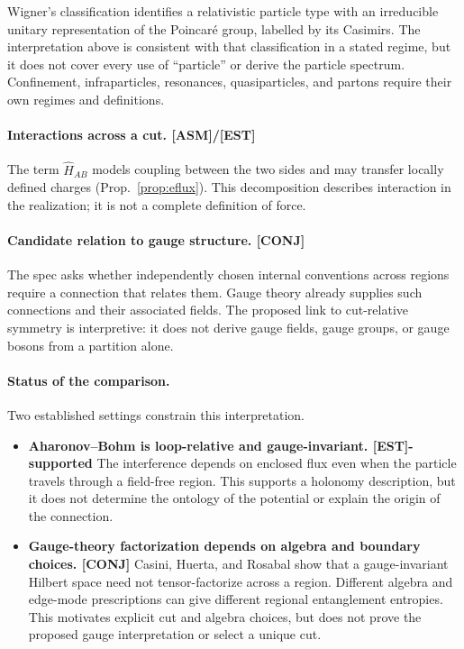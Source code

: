 \documentclass[11pt]{article}
\newcommand{\est}{\textcolor{teal!70!black}{\textsf{\small[EST]}}}
\newcommand{\fields}{\textcolor{violet}{\textsf{\small[FIELDS]}}}
\newcommand{\asm}{\textcolor{blue!70!black}{\textsf{\small[ASM]}}}
\newcommand{\conj}{\textcolor{orange!80!black}{\textsf{\small[CONJ]}}}
\newcommand{\post}{\textcolor{purple!70!black}{\textsf{\small[POST]}}}
\newcommand{\gap}{\textcolor{red!75!black}{\textsf{\small[GAP]}}}
\def\est{[EST]}\def\fields{[FIELDS]}\def\asm{[ASM]}%
\def\conj{[CONJ]}\def\post{[POST]}\def\gap{[GAP]}%
\theoremstyle{definition}
\theoremstyle{remark}
\begin{document}
\noindent Wigner's classification identifies a relativistic particle type with an irreducible unitary representation of the Poincar\'e group, labelled by its Casimirs. The interpretation above is consistent with that classification in a stated regime, but it does not cover every use of ``particle'' or derive the particle spectrum. Confinement, infraparticles, resonances, quasiparticles, and partons require their own regimes and definitions.

\paragraph{Interactions across a cut. \asm/\est}
The term $\hat{H}_{AB}$ models coupling between the two sides and may transfer locally defined charges (Prop.~\ref{prop:eflux}). This decomposition describes interaction in the realization; it is not a complete definition of force.

\paragraph{Candidate relation to gauge structure. \conj}
The spec asks whether independently chosen internal conventions across regions require a connection that relates them. Gauge theory already supplies such connections and their associated fields. The proposed link to cut-relative symmetry is interpretive: it does not derive gauge fields, gauge groups, or gauge bosons from a partition alone.

\paragraph{Status of the comparison.}
Two established settings constrain this interpretation.

\begin{itemize}[leftmargin=1.4em, itemsep=3pt, topsep=3pt]
  \item \textbf{Aharonov--Bohm is loop-relative and gauge-invariant. \est-supported} The interference depends on enclosed flux even when the particle travels through a field-free region. This supports a holonomy description, but it does not determine the ontology of the potential or explain the origin of the connection.
  \item \textbf{Gauge-theory factorization depends on algebra and boundary choices. \conj} Casini, Huerta, and Rosabal show that a gauge-invariant Hilbert space need not tensor-factorize across a region. Different algebra and edge-mode prescriptions can give different regional entanglement entropies. This motivates explicit cut and algebra choices, but does not prove the proposed gauge interpretation or select a unique cut.
\end{itemize}
\end{document}
